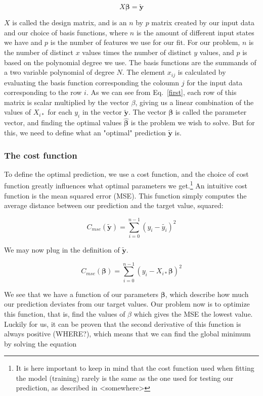 \documentclass[twocolumn,10pt,cleanfoot]{asme2ej}
\begin{document}
\begin{equation}
X \bm{\beta} = \bm{\tilde{y}}
\label{first}
\end{equation}


$X$ is called the design matrix, and is an $n$ by $p$ matrix created by our input data and our choice of basis functions, where $n$ is the amount of different input states we have and $p$ is the number of features we use for our fit. For our problem, $n$ is the number of distinct $x$ values times the number of distinct $y$ values, and $p$ is based on the polynomial degree we use. The basis functions are the summands of a two variable polynomial of degree $N$. The element $x_{ij}$ is calculated by evaluating the basis function corresponding the coloumn $j$ for the input data corresponding to the row $i$. As we can see from Eq.~\ref{first}, each row of this matrix is scalar multiplied by the vector $\beta$, giving us a linear combination of the values of $X_{i*}$ for each $y_i$ in the vector $\bm{\tilde{y}}$. The vector $\bm{\beta}$ is called the parameter vector, and finding the optimal values $\hat{\bm{\beta}}$ is the problem we wish to solve. But for this, we need to define what an "optimal" prediction $\bm{\tilde{y}}$ is.

\subsubsection{The cost function}

To define the optimal prediction, we use a cost function, and the choice of cost function greatly influences what optimal parameters we get.\footnote{It is here important to keep in mind that the cost function used when fitting the model (training) rarely is the same as the one used for testing our prediction, as described in <somewhere>} An intuitive cost function is the mean squared error (MSE). This function simply computes the average distance between our prediction and the target value, squared:

\begin{equation}
	C_{mse}(\tilde{\bm{y}}) = \sum_{i=0}^{n-1}(y_i-\tilde{y_i})^2
\end{equation}

We may now plug in the definition of $\bm{\tilde{y}}$.

\begin{equation}
	C_{mse}(\bm{\beta}) = \sum_{i=0}^{n-1}(y_i-X_{i*}\bm{\beta})^2
\end{equation}

We see that we have a function of our parameters $\bm{\beta}$, which describe how much our prediction deviates from our target values. Our problem now is to optimize this function, that is, find the values of $\beta$ which gives the MSE the lowest value. Luckily for us, it can be proven that the second derivative of this function is always positive (WHERE?), which means that we can find the global minimum by solving the equation
\end{document}
